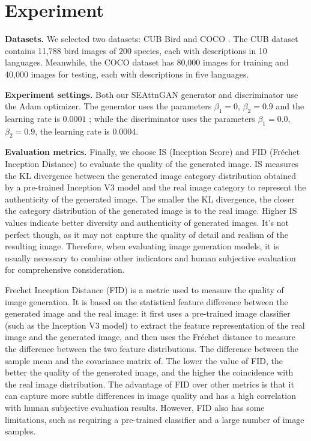 \documentclass[runningheads, orivec]{llncs}
\begin{document}
\section{Experiment}
\textbf{Datasets.} We selected two datasets: CUB Bird \cite{WahCUB_200_2011} and COCO \cite{lin2014microsoft}. The CUB dataset contains 11,788 bird images of 200 species, each with descriptions in 10 languages. Meanwhile, the COCO dataset has 80,000 images for training and 40,000 images for testing, each with descriptions in five languages.

\noindent \textbf{Experiment settings.} Both our SEAttnGAN generator and discriminator use the Adam optimizer. The generator uses the parameters $\beta_{1} = 0$, $\beta_{2} = 0.9$ and the learning rate is $0.0001$ \cite{kingma2014adam}; while the discriminator uses the parameters $\beta_{1} = 0.0$, $\beta_{2} = 0.9$, the learning rate is $0.0004$. 

\noindent \textbf{Evaluation metrics.} Finally, we choose IS (Inception Score) and FID (Fréchet Inception Distance) to evaluate the quality of the generated image. IS measures \cite{salimans2016improved} the KL divergence between the generated image category distribution obtained by a pre-trained Inception V3 model and the real image category to represent the authenticity of the generated image. The smaller the KL divergence, the closer the category distribution of the generated image is to the real image. Higher IS values indicate better diversity and authenticity of generated images. It's not perfect though, as it may not capture the quality of detail and realism of the resulting image. Therefore, when evaluating image generation models, it is usually necessary to combine other indicators and human subjective evaluation for comprehensive consideration.

Frechet Inception Distance (FID) \cite{heusel2017gans} is a metric used to measure the quality of image generation. It is based on the statistical feature difference between the generated image and the real image: it first uses a pre-trained image classifier (such as the Inception V3 model) to extract the feature representation of the real image and the generated image, and then uses the Fréchet distance to measure the difference between the two feature distributions. The difference between the sample mean and the covariance matrix of. The lower the value of FID, the better the quality of the generated image, and the higher the coincidence with the real image distribution. The advantage of FID over other metrics is that it can capture more subtle differences in image quality and has a high correlation with human subjective evaluation results. However, FID also has some limitations, such as requiring a pre-trained classifier and a large number of image samples.
\end{document}
